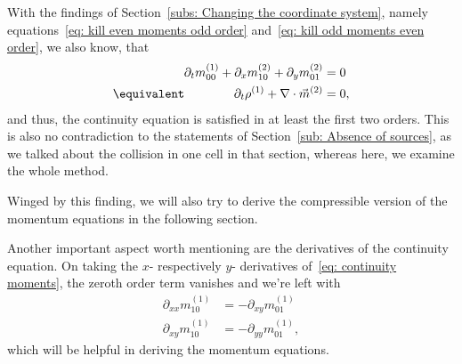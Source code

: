 With the findings of Section~\ref{subs: Changing the coordinate system},
namely equations~\eqref{eq: kill even moments odd order} and~\eqref{eq: kill odd moments even order}, we also know, that
\begin{equation}
  \label{eq: conti second order}
  \begin{aligned}
    \partial_t m_{00}^{(1)} + \partial_x m_{10}^{(2)}+ \partial_y m_{01}^{(2)} &= 0
    \\   \equivalent\qquad\qquad
    \partial_t \rho^{(1)} + \nabla \cdot \vec{m}^{(2)} &= 0,
  \end{aligned}
\end{equation}
and thus, the continuity equation is satisfied in at least the first two orders.
This is also no contradiction to the statements of Section~\eqref{sub: Absence of sources}, as we talked about the collision in one cell in that section, whereas here, we examine the whole method.

Winged by this finding, we will also try to derive the compressible version of the momentum equations in the following section.

Another important aspect worth mentioning are the derivatives of the continuity equation.
On taking the $x$- respectively $y$- derivatives of~\eqref{eq: continuity moments}, the zeroth order term vanishes and we're left with
\begin{align}
  \label{eq: continuity derivative x}
  \partial_{xx} m_{10}^{(1)} & = - \partial_{xy} m_{01}^{(1)}\\
  \label{eq: continuity derivative y}
  \partial_{xy} m_{10}^{(1)} & = - \partial_{yy} m_{01}^{(1)},
\end{align}
which will be helpful in deriving the momentum equations.
